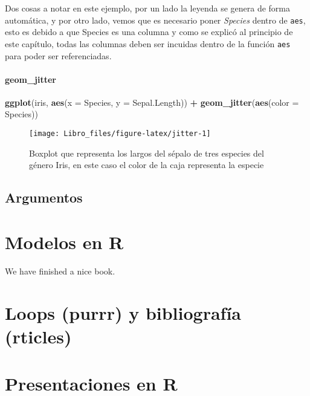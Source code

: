 \documentclass[]{book}
\newenvironment{Shaded}{\begin{snugshade}}{\end{snugshade}}
\newcommand{\DataTypeTok}[1]{\textcolor[rgb]{0.13,0.29,0.53}{#1}}
\newcommand{\KeywordTok}[1]{\textcolor[rgb]{0.13,0.29,0.53}{\textbf{#1}}}
\newcommand{\NormalTok}[1]{#1}
\newcommand{\OperatorTok}[1]{\textcolor[rgb]{0.81,0.36,0.00}{\textbf{#1}}}
\newcommand{\StringTok}[1]{\textcolor[rgb]{0.31,0.60,0.02}{#1}}
\begin{document}
Dos cosas a notar en este ejemplo, por un lado la leyenda se genera de
forma automática, y por otro lado, vemos que es necesario poner
\emph{Species} dentro de \texttt{aes}, esto es debido a que Species es
una columna y como se explicó al principio de este capítulo, todas las
columnas deben ser incuidas dentro de la función \texttt{aes} para poder
ser referenciadas.

\hypertarget{geom_jitter}{%
\subsubsection{geom\_jitter}\label{geom_jitter}}

\begin{Shaded}
\begin{Highlighting}[]
\KeywordTok{ggplot}\NormalTok{(iris, }\KeywordTok{aes}\NormalTok{(}\DataTypeTok{x =}\NormalTok{ Species, }\DataTypeTok{y =}\NormalTok{ Sepal.Length)) }\OperatorTok{+}\StringTok{ }\KeywordTok{geom_jitter}\NormalTok{(}\KeywordTok{aes}\NormalTok{(}\DataTypeTok{color =}\NormalTok{ Species))}
\end{Highlighting}
\end{Shaded}

\begin{figure}

{\centering \texttt{[image: Libro\_files/figure-latex/jitter-1]} 

}

\caption{Boxplot que representa los largos del sépalo de tres especies del género Iris, en este caso el color de la caja representa la especie}\label{fig:jitter}
\end{figure}

\hypertarget{argumentos}{%
\section{Argumentos}\label{argumentos}}

\hypertarget{modelos}{%
\chapter{Modelos en R}\label{modelos}}

We have finished a nice book.

\hypertarget{loops}{%
\chapter{Loops (purrr) y bibliografía (rticles)}\label{loops}}

\hypertarget{presentacion}{%
\chapter{Presentaciones en R}\label{presentacion}}


\end{document}
